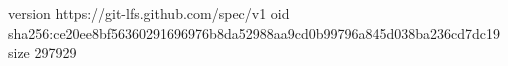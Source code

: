 version https://git-lfs.github.com/spec/v1
oid sha256:ce20ee8bf56360291696976b8da52988aa9cd0b99796a845d038ba236cd7dc19
size 297929
